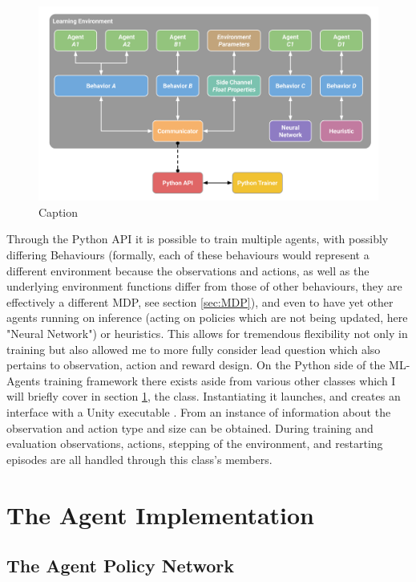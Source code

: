 \begin{figure}[H]
    \centering
    \includegraphics[width=0.75\linewidth]{figures/ml_agents_python_communicator.png}
    \caption{Caption}
    \label{fig:python_communicator}
\end{figure}

\noindent
Through the Python API it is possible to train multiple agents, with possibly differing Behaviours (formally, each of these behaviours would represent a different environment because the observations and actions, as well as the underlying environment functions differ from those of other behaviours, they are effectively a different MDP, see section \ref{sec:MDP}), and even to have yet other agents running on inference (acting on policies which are not being updated, here "Neural Network") or heuristics. This allows for tremendous flexibility not only in training but also allowed me to more fully consider lead question which also pertains to observation, action and reward design. On the Python side of the ML-Agents training framework there exists aside from various other classes which I will briefly cover in section \ref{sec:ip:agent_implementation}, the  class. Instantiating it launches, and creates an interface with a Unity executable \cite[p. 13]{juliani2020unity}. From an instance of  information about the observation and action type and size can be obtained. During training and evaluation observations, actions, stepping of the environment, and restarting episodes are all handled through this class's members.

\section{The Agent Implementation}\label{sec:ip:agent_implementation}
\subsection{The Agent Policy Network}\label{subsec:ip:agent:network}
